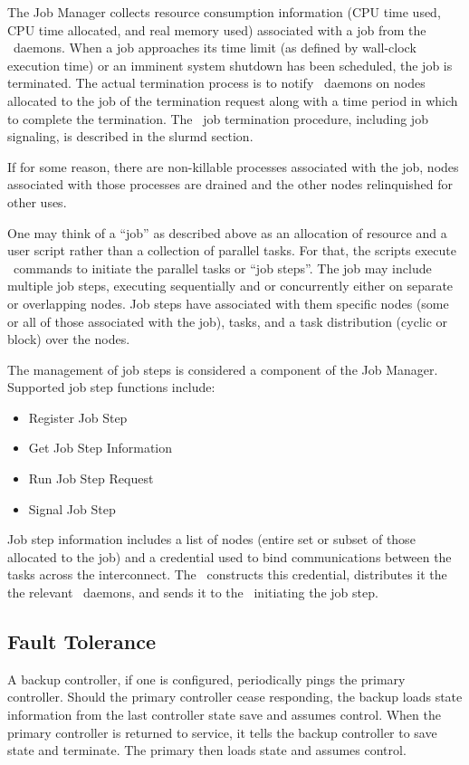 The Job Manager collects resource consumption information (CPU
time used, CPU time allocated, and real memory used) associated with
a job from the \slurmd\ daemons.  When a job approaches its time limit
(as defined by wall-clock execution time) or an imminent system shutdown
has been scheduled, the job is terminated.  The actual termination
process is to notify \slurmd\ daemons on nodes allocated to the job of
the termination request along with a time period in which to complete
the termination.  The \slurmd\ job termination procedure, including job
signaling, is described in the slurmd section.

If for some reason, there are non-killable processes associated with 
the job, nodes associated with those processes are drained and 
the other nodes relinquished for other uses.

One may think of a ``job'' as described above as an allocation of resource 
and a user script rather than a collection of parallel tasks. For that, 
the scripts execute \srun\ commands to initiate the parallel tasks 
or ``job steps''. The job may include multiple job steps, executing 
sequentially and or concurrently either on separate or overlapping nodes. 
Job steps have associated with them specific nodes (some or all of those 
associated with the job), tasks, and a task distribution (cyclic or 
block) over the nodes. 

The management of job steps is considered a component of the Job 
Manager.
Supported job step functions include:
\begin{itemize}
\item Register Job Step
\item Get Job Step Information
\item Run Job Step Request
\item Signal Job Step
\end{itemize}
Job step information includes a list of 
nodes (entire set or subset of those allocated to the job) and a 
credential used to bind communications between the tasks across 
the interconnect. The \slurmctld\ constructs this credential, 
distributes it the the relevant \slurmd\ daemons, and sends it to 
the \srun\ initiating the job step.

\subsection{Fault Tolerance}

A backup controller, if one is configured, periodically pings
the primary controller.  Should the primary controller cease
responding, the backup loads state information from the last 
controller state save and assumes control.  
When the primary controller is returned to service, it tells the 
backup controller to save state and terminate.  
The primary then loads state and assumes control.

